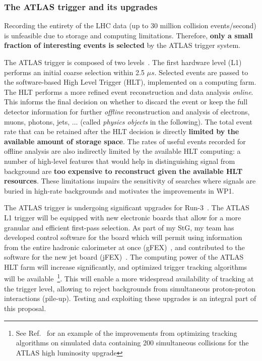\subsubsection{The ATLAS trigger and its upgrades}
\smallskip

Recording the entirety of the LHC data (up to 30 million collision events/second) is unfeasible due to storage and computing limitations. 
Therefore, \textbf{only a small fraction of interesting events is selected} by the ATLAS trigger system. 

The ATLAS trigger is composed of two levels~\cite{ToBeCited}. %
The first hardware level (L1) performs an initial coarse selection within 2.5 $\mu s$. 
Selected events are passed to the software-based High Level Trigger (HLT), implemented on a computing farm. 
The HLT performs a more refined event reconstruction and data analysis \textit{online}. 
This informs the final decision on whether to discard the event or keep the full detector information for further \textit{offline} reconstruction and analysis of electrons, muons, photons, jets, ... (called \textit{physics objects} in the following). 
The total event rate that can be retained after the HLT decision is directly \textbf{limited by the available amount of storage space}. 
The rates of useful events recorded for offline analysis are also indirectly limited by the available HLT computing: 
a number of high-level features that would help in distinguishing signal from background are \textbf{too expensive to reconstruct given the available HLT resources}. 
These limitations impairs the sensitivity of searches where signals are buried in high-rate backgrounds and motivates the improvements in WP1. 

The ATLAS trigger is undergoing significant upgrades for Run-3~\cite{Aad:1602235}. 
The ATLAS L1 trigger will be equipped with new electronic boards that allow for a more granular and efficient first-pass selection. 
As part of my StG, my team has developed control software for the board which will permit using information from the entire hadronic calorimeter at once (gFEX)~\cite{Tang:2016ded}, 
and contributed to the software for the new jet board (jFEX)~\cite{Bauss:2018nde}. 
The computing power of the ATLAS HLT farm will increase significantly, and optimized trigger tracking algorithms will be available~\footnote{See 
Ref.~\cite{ATL-PHYS-PUB-2019-041} %
for an example of the improvements from optimizing tracking algorithms on simulated data containing 200 simultaneous collisions for the ATLAS high luminosity upgrade}. 
This will enable a more widespread availability of tracking at the trigger level, allowing to reject backgrounds from simultaneous proton-proton interactions (pile-up). Testing and exploiting these upgrades is an integral part of this proposal. 

